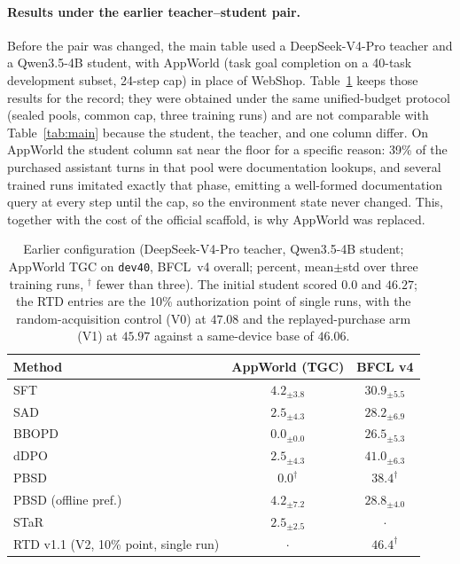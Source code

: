 \paragraph{Results under the earlier teacher--student pair.}
Before the pair was changed, the main table used a DeepSeek-V4-Pro
teacher and a Qwen3.5-4B student, with AppWorld (task goal completion
on a 40-task development subset, 24-step cap) in place of WebShop.
Table~\ref{tab:earlier} keeps those results for the record; they were
obtained under the same unified-budget protocol (sealed pools, common
cap, three training runs) and are not comparable with
Table~\ref{tab:main} because the student, the teacher, and one column
differ. On AppWorld the student column sat near the floor for a
specific reason: 39\% of the purchased assistant turns in that pool
were documentation lookups, and several trained runs imitated exactly
that phase, emitting a well-formed documentation query at every step
until the cap, so the environment state never changed. This, together
with the cost of the official scaffold, is why AppWorld was replaced.

\begin{table}[h]
\centering
\caption{Earlier configuration (DeepSeek-V4-Pro teacher, Qwen3.5-4B
student; AppWorld TGC on \texttt{dev40}, BFCL~v4 overall; percent,
mean$\pm$std over three training runs, $^{\dagger}$ fewer than three).
The initial student scored $0.0$ and $46.27$; the RTD entries are the
10\% authorization point of single runs, with the random-acquisition
control (V0) at $47.08$ and the replayed-purchase arm (V1) at $45.97$
against a same-device base of $46.06$.}
\label{tab:earlier}
\small
\begin{tabular}{lcc}
\toprule
Method & AppWorld (TGC) & BFCL v4\\
\midrule
SFT & $4.2_{\pm3.8}$ & $30.9_{\pm5.5}$\\
SAD & $2.5_{\pm4.3}$ & $28.2_{\pm6.9}$\\
BBOPD & $0.0_{\pm0.0}$ & $26.5_{\pm5.3}$\\
dDPO & $2.5_{\pm4.3}$ & $41.0_{\pm6.3}$\\
PBSD & $0.0^{\dagger}$ & $38.4^{\dagger}$\\
PBSD (offline pref.) & $4.2_{\pm7.2}$ & $28.8_{\pm4.0}$\\
STaR & $2.5_{\pm2.5}$ & $\cdot$\\
RTD v1.1 (V2, 10\% point, single run) & $\cdot$ & $46.4^{\dagger}$\\
\bottomrule
\end{tabular}
\end{table}

